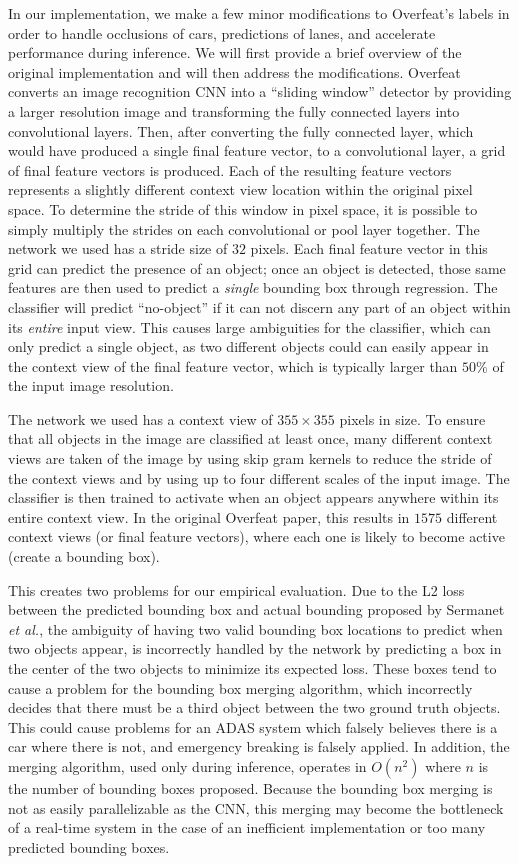 \documentclass[journal]{IEEEtran}
\begin{document}
In our implementation, we make a few minor modifications to Overfeat's labels in order to handle occlusions of cars, predictions of lanes, and accelerate performance during inference. We will first provide a brief overview of the original implementation and will then address the modifications. Overfeat converts an image recognition CNN into a ``sliding window'' detector by providing a larger resolution image and transforming the fully connected layers into convolutional layers. Then, after converting the fully connected layer, which would have produced a single final feature vector, to a convolutional layer, a grid of final feature vectors is produced. Each of the resulting feature vectors represents a slightly different context view location within the original pixel space. To determine the stride of this window in pixel space, it is possible to simply multiply the strides on each convolutional or pool layer together. The network we used has a stride size of $32$ pixels. Each final feature vector in this grid can predict the presence of an object; once an object is detected, those same features are then used to predict a \textit{single} bounding box through regression. The classifier will predict ``no-object'' if it can not discern any part of an object within its \textit{entire} input view. This causes large ambiguities for the classifier, which can only predict a single object, as two different objects could can easily appear in the context view of the final feature vector, which is typically larger than $50\%$ of the input image resolution.

The network we used has a context view of $355 \times 355$ pixels in size. To ensure that all objects in the image are classified at least once, many different context views are taken of the image by using skip gram kernels to reduce the stride of the context views and by using up to four different scales of the input image. The classifier is then trained to activate when an object appears anywhere within its entire context view. In the original Overfeat paper, this results in $1575$ different context views (or final feature vectors), where each one is likely to become active (create a bounding box).

This creates two problems for our empirical evaluation. Due to the L2 loss between the predicted bounding box and actual bounding proposed by Sermanet \textit{et al.}, the ambiguity of having two valid bounding box locations to predict when two objects appear, is incorrectly handled by the network by predicting a box in the center of the two objects to minimize its expected loss. These boxes tend to cause a problem for the bounding box merging algorithm, which incorrectly decides that there must be a third object between the two ground truth objects. This could cause problems for an ADAS system which falsely believes there is a car where there is not, and emergency breaking is falsely applied. In addition, the merging algorithm, used only during inference, operates in $O(n^2)$ where $n$ is the number of bounding boxes proposed. Because the bounding box merging is not as easily parallelizable as the CNN, this merging may become the bottleneck of a real-time system in the case of an inefficient implementation or too many predicted bounding boxes.
\end{document}
